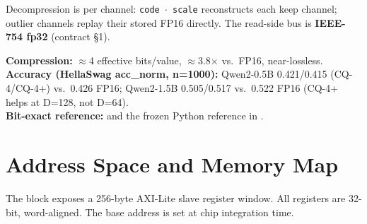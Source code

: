 \documentclass[11pt]{article}
\begin{document}
\noindent Decompression is per channel: \texttt{code $\cdot$ scale} reconstructs
each keep channel; outlier channels replay their stored FP16 directly. The
read-side bus is \textbf{IEEE-754 fp32} (contract \S1).

\medskip
\noindent\textbf{Compression:} $\approx$4 effective bits/value, $\approx$3.8$\times$
vs.\ FP16, near-lossless.\\
\textbf{Accuracy (HellaSwag acc\_norm, n=1000):} Qwen2-0.5B 0.421/0.415 (CQ-4/CQ-4+)
vs.\ 0.426 FP16; Qwen2-1.5B 0.505/0.517 vs.\ 0.522 FP16 (CQ-4+ helps at D=128, not D=64).\\
\textbf{Bit-exact reference:} 
and the frozen Python reference in .

\section{Address Space and Memory Map}
\label{sec:memmap}

The block exposes a 256-byte AXI-Lite slave register window. All registers
are 32-bit, word-aligned. The base address is set at chip integration time.
\end{document}

